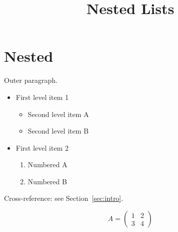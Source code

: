 \documentclass{article}
\title{Nested Lists}
\begin{document}
\section{Nested}

Outer paragraph.

\begin{itemize}
\item First level item 1
  \begin{itemize}
  \item Second level item A
  \item Second level item B
  \end{itemize}
\item First level item 2
  \begin{enumerate}
  \item Numbered A
  \item Numbered B
  \end{enumerate}
\end{itemize}

Cross-reference: see Section~\ref{sec:intro}.

\begin{equation}
A = \begin{pmatrix} 1 & 2 \\ 3 & 4 \end{pmatrix}
\end{equation}
\end{document}
